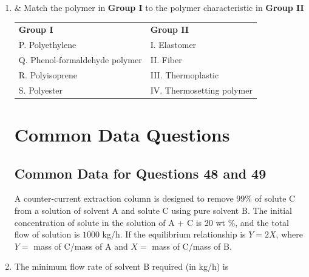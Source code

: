 \documentclass[journal,12pt,onecolumn]{IEEEtran}
\theoremstyle{remark}
\begin{document}
\begin{enumerate}
\item & Match the polymer in \textbf{Group I} to the polymer characteristic in \textbf{Group II}\\
\begin{tabular}{ll}
\textbf{Group I} & \textbf{Group II} \\
P. Polyethylene & I. Elastomer \\
Q. Phenol-formaldehyde polymer & II. Fiber \\
R. Polyisoprene & III. Thermoplastic \\
S. Polyester & IV. Thermosetting polymer \\
\end{tabular}
\hfill{}
\begin{enumerate}
\end{enumerate}

\section*{Common Data Questions}

\subsection*{Common Data for Questions 48 and 49}
A counter-current extraction column is designed to remove $99\%$ of solute C from a solution of solvent A and solute C using pure solvent B. The initial concentration of solute in the solution of A + C is $20$ wt $\%$, and the total flow of solution is $1000$ kg/h. If the equilibrium relationship is $Y = 2X$, where $Y =$ mass of C/mass of A and $X =$ mass of C/mass of B.

    \item The minimum flow rate of solvent B required (in kg/h) is
    \hfill{}
    \begin{enumerate}
        \end{enumerate}
    

\end{enumerate}
\end{document}
